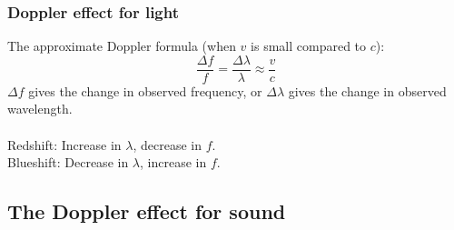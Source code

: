 \subsubsection*{Doppler effect for light}
The approximate Doppler formula (when $v$ is small compared to $c$):
\[\dfrac{\Delta f}{f}=\dfrac{\Delta \lambda}{\lambda}\approx\dfrac{v}{c}\]
$\Delta f$ gives the change in observed frequency, or $\Delta\lambda$ gives the change in observed wavelength.\\\\
Redshift: Increase in $\lambda$, decrease in $f$.\\
Blueshift: Decrease in $\lambda$, increase in $f$.
\subsection{The Doppler effect for sound} 
